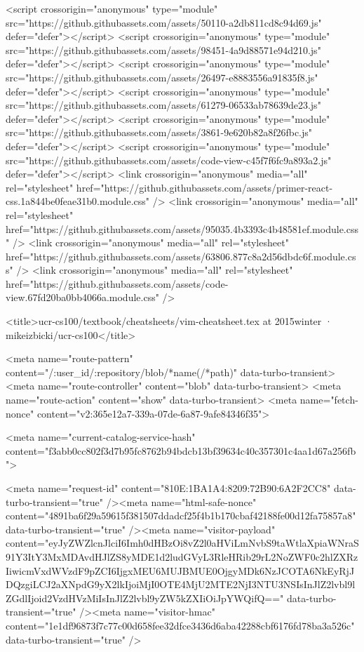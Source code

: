 <script crossorigin="anonymous" type="module" src="https://github.githubassets.com/assets/50110-a2db811cd8c94d69.js" defer="defer"></script>
<script crossorigin="anonymous" type="module" src="https://github.githubassets.com/assets/98451-4a9d88571e94d210.js" defer="defer"></script>
<script crossorigin="anonymous" type="module" src="https://github.githubassets.com/assets/26497-e8883556a91835f8.js" defer="defer"></script>
<script crossorigin="anonymous" type="module" src="https://github.githubassets.com/assets/61279-06533ab78639de23.js" defer="defer"></script>
<script crossorigin="anonymous" type="module" src="https://github.githubassets.com/assets/3861-9e620b82a8f26fbc.js" defer="defer"></script>
<script crossorigin="anonymous" type="module" src="https://github.githubassets.com/assets/code-view-c45f7f6fc9a893a2.js" defer="defer"></script>
<link crossorigin="anonymous" media="all" rel="stylesheet" href="https://github.githubassets.com/assets/primer-react-css.1a844be0feae31b0.module.css" />
<link crossorigin="anonymous" media="all" rel="stylesheet" href="https://github.githubassets.com/assets/95035.4b3393c4b48581ef.module.css" />
<link crossorigin="anonymous" media="all" rel="stylesheet" href="https://github.githubassets.com/assets/63806.877c8a2d56dbdc6f.module.css" />
<link crossorigin="anonymous" media="all" rel="stylesheet" href="https://github.githubassets.com/assets/code-view.67fd20ba0bb4066a.module.css" />


  <title>ucr-cs100/textbook/cheatsheets/vim-cheatsheet.tex at 2015winter · mikeizbicki/ucr-cs100</title>



  <meta name="route-pattern" content="/:user_id/:repository/blob/*name(/*path)" data-turbo-transient>
  <meta name="route-controller" content="blob" data-turbo-transient>
  <meta name="route-action" content="show" data-turbo-transient>
  <meta name="fetch-nonce" content="v2:365e12a7-339a-07de-6a87-9afe84346f35">

    
  <meta name="current-catalog-service-hash" content="f3abb0cc802f3d7b95fc8762b94bdcb13bf39634c40c357301c4aa1d67a256fb">


  <meta name="request-id" content="810E:1BA1A4:8209:72B90:6A2F2CC8" data-turbo-transient="true" /><meta name="html-safe-nonce" content="4891ba6f29a59615f381507ddadcf25f4b1b170cbaf42188fe00d12fa75857a8" data-turbo-transient="true" /><meta name="visitor-payload" content="eyJyZWZlcnJlciI6Imh0dHBzOi8vZ2l0aHViLmNvbS9taWtlaXpiaWNraS91Y3ItY3MxMDAvdHJlZS8yMDE1d2ludGVyL3RleHRib29rL2NoZWF0c2hlZXRzIiwicmVxdWVzdF9pZCI6IjgxMEU6MUJBMUE0OjgyMDk6NzJCOTA6NkEyRjJDQzgiLCJ2aXNpdG9yX2lkIjoiMjI0OTE4MjU2MTE2NjI3NTU3NSIsInJlZ2lvbl9lZGdlIjoid2VzdHVzMiIsInJlZ2lvbl9yZW5kZXIiOiJpYWQifQ==" data-turbo-transient="true" /><meta name="visitor-hmac" content="1e1df96873f7c77c00d658fee32dfce3436d6aba42288cbf6176fd78ba3a526c" data-turbo-transient="true" />


